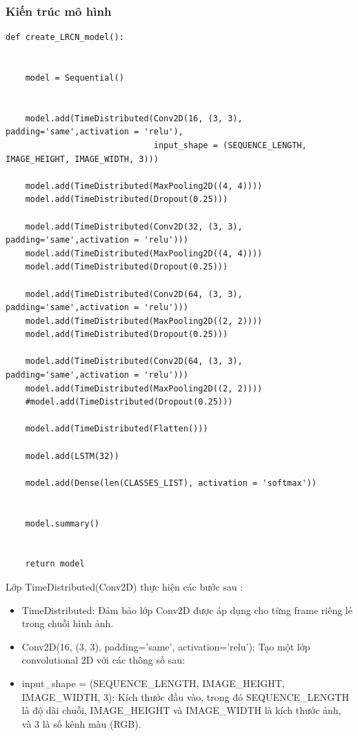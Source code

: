 \subsubsection{Kiến trúc mô hình}
\begin{lstlisting}[style=codePython]
def create_LRCN_model():


    model = Sequential()


    model.add(TimeDistributed(Conv2D(16, (3, 3), padding='same',activation = 'relu'),
                              input_shape = (SEQUENCE_LENGTH, IMAGE_HEIGHT, IMAGE_WIDTH, 3)))

    model.add(TimeDistributed(MaxPooling2D((4, 4))))
    model.add(TimeDistributed(Dropout(0.25)))

    model.add(TimeDistributed(Conv2D(32, (3, 3), padding='same',activation = 'relu')))
    model.add(TimeDistributed(MaxPooling2D((4, 4))))
    model.add(TimeDistributed(Dropout(0.25)))

    model.add(TimeDistributed(Conv2D(64, (3, 3), padding='same',activation = 'relu')))
    model.add(TimeDistributed(MaxPooling2D((2, 2))))
    model.add(TimeDistributed(Dropout(0.25)))

    model.add(TimeDistributed(Conv2D(64, (3, 3), padding='same',activation = 'relu')))
    model.add(TimeDistributed(MaxPooling2D((2, 2))))
    #model.add(TimeDistributed(Dropout(0.25)))

    model.add(TimeDistributed(Flatten()))

    model.add(LSTM(32))

    model.add(Dense(len(CLASSES_LIST), activation = 'softmax'))


    model.summary()


    return model

\end{lstlisting}
Lớp TimeDistributed(Conv2D) thực hiện các bước sau : 
\begin{itemize}
    \item TimeDistributed: Đảm bảo lớp Conv2D được áp dụng cho từng frame riêng lẻ trong chuỗi hình ảnh.
    \item Conv2D(16, (3, 3), padding='same', activation='relu'): Tạo một lớp convolutional 2D với các thông số sau:
    \item input\_shape = (SEQUENCE\_LENGTH, IMAGE\_HEIGHT, IMAGE\_WIDTH, 3): Kích thước đầu vào, trong đó SEQUENCE\_LENGTH là độ dài chuỗi, IMAGE\_HEIGHT và IMAGE\_WIDTH là kích thước ảnh, và 3 là số kênh màu (RGB).
\end{itemize}
